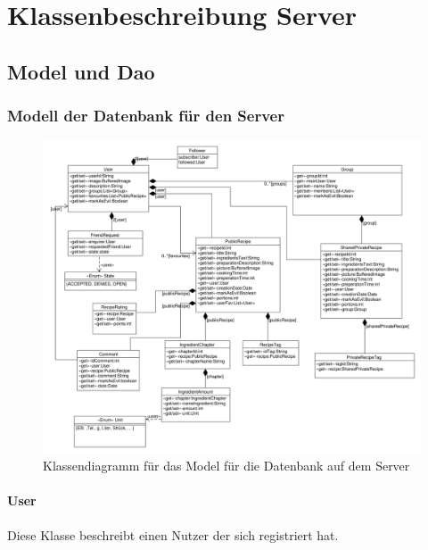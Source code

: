 \chapter{Klassenbeschreibung Server}

\section{Model und Dao}

\subsection{Modell der Datenbank für den Server} 

\begin{figure}[H]
	\centering
	\includegraphics[width=1.0\textwidth]{pics/ServerModel.pdf}%
	\caption{Klassendiagramm für das Model für die Datenbank auf dem Server}%
\end{figure}

\subsubsection{User}
Diese Klasse beschreibt einen Nutzer der sich registriert hat.

